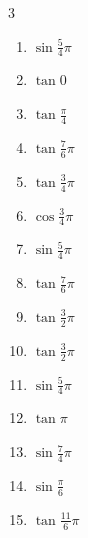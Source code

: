 \begin{multicols}{3}
\begin{enumerate}
  \item $\displaystyle \sin{\frac{5}{4}\pi}$

  \item $\displaystyle \tan{0}$
        \phantom{$\displaystyle =0$}

  \item $\displaystyle \tan{\frac{\pi}{4}}$
        \phantom{$\displaystyle =1$}

  \item $\displaystyle \tan{\frac{7}{6}\pi}$

\columnbreak %

  \item $\displaystyle \tan{\frac{3}{4}\pi}$
        \phantom{$\displaystyle =-1$}

  \item $\displaystyle \cos{\frac{3}{4}\pi}$

  \item $\displaystyle \sin{\frac{5}{4}\pi}$

  \item $\displaystyle \tan{\frac{7}{6}\pi}$

  \item $\displaystyle \tan{\frac{3}{2}\pi}$
        \phantom{$\displaystyle \quad なし$}

  \item $\displaystyle \tan{\frac{3}{2}\pi}$
        \phantom{$\displaystyle \quad なし$}

  \item $\displaystyle \sin{\frac{5}{4}\pi}$

  \item $\displaystyle \tan{\pi}$
        \phantom{$\displaystyle =0$}

  \item $\displaystyle \sin{\frac{7}{4}\pi}$

  \item $\displaystyle \sin{\frac{\pi}{6}}$

  \item $\displaystyle \tan{\frac{11}{6}\pi}$


\end{enumerate}
\end{multicols}
